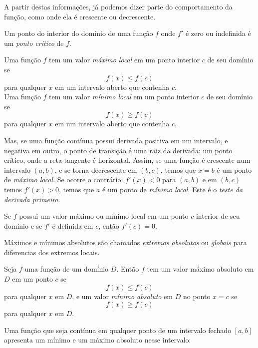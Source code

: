 A partir destas informações, já podemos dizer parte do comportamento da função, como onde ela é crescente ou decrescente.
\begin{df}
Um ponto do interior do domínio de uma função $f$ onde $f'$ é zero ou indefinida é um \emph{ponto crítico} de $f$.
\end{df}
\begin{df}
Uma função $f$ tem um valor \emph{máximo local} em um ponto interior $c$ de seu domínio se \[f(x)\le f(c)\] para qualquer $x$ em um intervalo aberto que contenha $c$. \\ Uma função $f$ tem um valor \emph{mínimo local} em um ponto interior $c$ de seu domínio se \[f(x)\ge f(c)\] para qualquer $x$ em um intervalo aberto que contenha $c$.
\end{df}
Mas, se uma função contínua possui derivada positiva em um intervalo, e negativa em outro, o ponto de transição é uma raiz da derivada: um ponto crítico, onde a reta tangente é horizontal. Assim, se uma função é crescente num intervalo $(a,b)$, e se torna decrescente em $(b,c)$, temos que $x=b$ é um ponto de \emph{máximo local}. Se ocorre o contrário: $f'(x)<0$ para $(a,b)$ e em $(b,c)$ temos $f'(x)>0$, temos que $a$ é um ponto de \emph{mínimo local}. Este é o \emph{teste da derivada primeira}.
\begin{teo}
Se $f$ possui um valor máximo ou mínimo local em um ponto $c$ interior de seu domínio e se $f'$ é definida em $c$, então $f'(c)=0$.
\end{teo}
Máximos e mínimos absolutos são chamados \emph{extremos absolutos} ou \emph{globais} para diferencias dos extremos locais.
\begin{df}
Seja $f$ uma função de um domínio $D$. Então $f$ tem um valor máximo absoluto em $D$ em um ponto $c$ se \[f(x) \le f(c)\] para qualquer $x$ em $D$, e um valor \emph{mínimo absoluto} em $D$ no ponto $x=c$ se \[f(x)\ge f(c)\] para qualquer $x$ em $D$.
\end{df}
Uma função que seja contínua em qualquer ponto de um intervalo fechado $[a,b]$ apresenta um mínimo e um máximo absoluto nesse intervalo:

